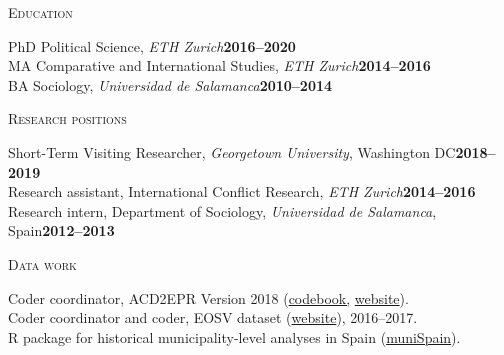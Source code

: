 \documentclass[a4paper, 10pt]{article}
\begin{document}
\vspace{12pt}


\noindent
\begin{minipage}[t]{0.13\textwidth}
	\flushleft
  \textsc{\footnotesize Education}
\end{minipage}
\begin{minipage}[t]{0.87\textwidth}
	PhD Political Science, {\it ETH Zurich}\hfill\textbf{2016--2020}\\
  MA Comparative and International Studies, {\it ETH Zurich}\hfill\textbf{2014--2016}\\
  BA Sociology, {\it Universidad de Salamanca}\hfill\textbf{2010--2014}\\
\end{minipage}

\vspace{3pt}


\noindent
\begin{minipage}[t]{0.13\textwidth}
  \flushleft
  \textsc{\footnotesize Research positions}
\end{minipage}
\begin{minipage}[t]{0.87\textwidth}
  Short-Term Visiting Researcher, {\it Georgetown University}, Washington DC\hfill{\bf 2018--2019}\\
  Research assistant, International Conflict Research, {\it ETH Zurich}\hfill{\bf 2014--2016}\\
  Research intern, Department of Sociology, {\it Universidad de Salamanca}, Spain\hfill{\bf 2012--2013}
\end{minipage}

\vspace{8pt}


\noindent
\begin{minipage}[t]{0.13\textwidth}
  \flushleft
  \textsc{\footnotesize Data work}
\end{minipage}
\begin{minipage}[t]{0.87\textwidth}
  Coder coordinator, ACD2EPR Version 2018 (\href{https://icr.ethz.ch/data/epr/acd2epr/ACD2EPR-2018_Codebook.pdf}{codebook,} \href{https://icr.ethz.ch/data/epr/acd2epr/}{website}).\\
  Coder coordinator and coder, EOSV dataset (\href{https://snis.ch/project/civilian-victimization-conflict-escalation/}{website}), 2016--2017.\\
  R package for historical municipality-level analyses in Spain (\href{https://github.com/franvillamil/muniSpain}{muniSpain}).
\end{minipage}
\end{document}
